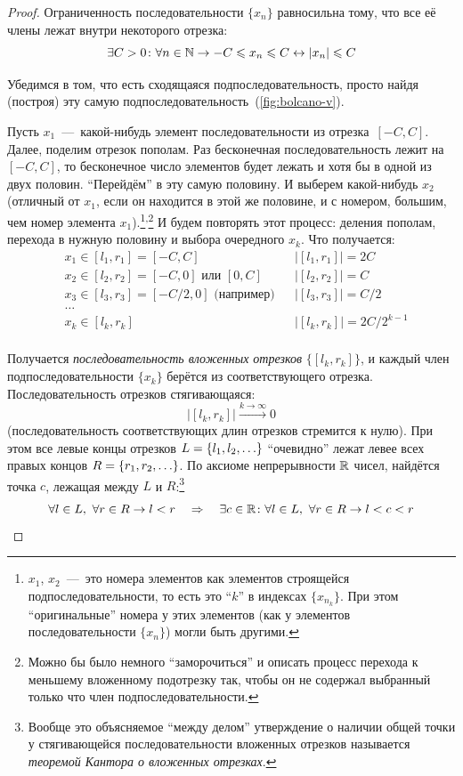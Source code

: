 \documentclass[a4paper,12pt]{article}
\begin{document}
  \begin{proof}
    Ограниченность последовательности $\{x_n\}$ равносильна тому, что все её члены лежат внутри некоторого отрезка:
    \[
      \exists C > 0\colon \forall n \in \mathbb N \to -C \leqslant x_n \leqslant C \leftrightarrow |x_n| \leqslant C
    \]
    
    Убедимся в том, что есть сходящаяся подпоследовательность, просто найдя (построя) эту самую подпоследовательность~(\ref{fig:bolcano-v}).
    
    Пусть $x_1$~---~какой-нибудь элемент последовательности из отрезка~$[-C, C]$.
    Далее, поделим отрезок пополам.
    Раз бесконечная последовательность лежит на $[-C, C]$, то бесконечное число элементов будет лежать и хотя бы в одной из двух половин.
    ``Перейдём'' в эту самую половину.
    И выберем какой-нибудь $x_2$ (отличный от $x_1$, если он находится в этой же половине, и с номером, большим, чем номер элемента $x_1$).\footnote{
      $x_1$, $x_2$~---~это номера элементов как элементов строящейся подпоследовательности, то есть это ``$k$'' в индексах $\{x_{n_k}\}$.
      При этом ``оригинальные'' номера у этих элементов (как у элементов последовательности $\{x_n\}$) могли быть другими.
    }\textsuperscript{,}\footnote{
      Можно бы было немного ``заморочиться'' и описать процесс перехода к меньшему вложенному подотрезку так, чтобы он не содержал выбранный только что член подпоследовательности.
    }
    И будем повторять этот процесс: деления пополам, перехода в нужную половину и выбора очередного $x_k$.
    Что получается:
    \[
      \begin{aligned}
        &x_1 \in [l_1, r_1] = [-C, C]                        & &\bigl|[l_1, r_1]\bigr| = 2C\\
        &x_2 \in [l_2, r_2] = [-C, 0] \mbox{ или } [0, C]    & &\bigl|[l_2, r_2]\bigr| = C\\
        &x_3 \in [l_3, r_3] = [-C/2, 0] \mbox{ (например)}   & &\bigl|[l_3, r_3]\bigr| = C/2\\
        &\ldots\\
        &x_k \in [l_k, r_k]                                  & &\bigl|[l_k, r_k]\bigr| = 2C/2^{k - 1}\\
      \end{aligned}
    \]
    
    Получается \emph{последовательность вложенных отрезков} $\bigl\{[l_k, r_k]\bigr\}$, и каждый член подпоследовательности $\{x_k\}$ берётся из соответствующего отрезка.
    Последовательность отрезков стягивающаяся:
    \[
      \bigl|[l_k, r_k]\bigr| \xrightarrow{k\to \infty} 0
    \]
    (последовательность соответствующих длин отрезков стремится к нулю).
    При этом все левые концы отрезков $L \hm= \{l_1, l_2, \ldots\}$ ``очевидно'' лежат левее всех правых концов $R \hm= \{r_1, r_2, \ldots\}$.
    По аксиоме непрерывности $\operatorname{\mathbb R}$ чисел, найдётся точка $c$, лежащая между $L$ и $R$:\footnote{
      Вообще это объясняемое ``между делом'' утверждение о наличии общей точки у стягивающейся последовательности вложенных отрезков называется \emph{теоремой Кантора о вложенных отрезках}.
    }
    \[
      \forall l \in L,\ \forall r \in R \to l < r \quad\Rightarrow\quad \exists c \in \operatorname{\mathbb R}\colon \forall l \in L,\ \forall r \in R \to l < c < r
    \]
    

\end{proof}
\end{document}
